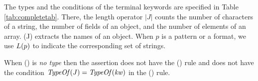 
The types and the conditions of the terminal keywords are specified in Table \ref{tab:completetab}.
There, the length operator $|J|$ counts the number of characters of a string, the number of fields of an object,
and the number of elements of an array. (J) extracts the names of an object.
When $p$ is a pattern or a format, we use $L(p)$ to indicate 
the corresponding set of strings.

When  \TypeOf() is \emph{no type} then the assertion does not have the (\TTriv) rule and does not have the condition
$\mathit{TypeOf}(J) = \mathit{TypeOf}(\mathit{kw})$ in the () rule. \\ 
\medskip

